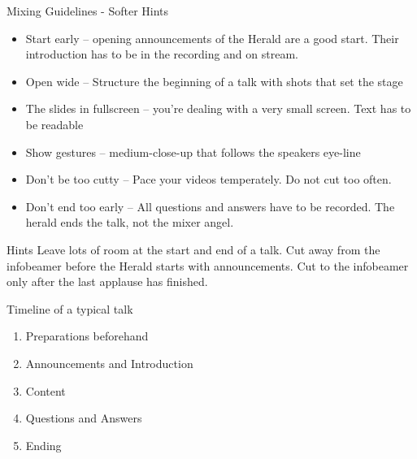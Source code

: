 \documentclass[aspectratio=169]{beamer}
\begin{document}
\begin{frame}{Mixing Guidelines - Softer Hints}
	\begin{itemize}
		\item Start early – opening announcements of the Herald are a good start. Their introduction has to be in the recording and on stream.
		\item Open wide – Structure the beginning of a talk with shots that set the stage
		\item The slides in fullscreen – you’re dealing with a very small screen. Text has to be readable
		\item Show gestures – medium-close-up that follows the speakers eye-line
		\item Don’t be too cutty – Pace your videos temperately. Do not cut too often.
		\item Don't end too early – All questions and answers have to be recorded. The herald ends the talk, not the mixer angel.
	\end{itemize}
	\begin{exampleblock}{Hints}
		Leave lots of room at the start and end of a talk. 
		Cut away from the infobeamer before the Herald starts with announcements. 
		Cut to the infobeamer only after the last applause has finished.
	\end{exampleblock}
\end{frame}


%
\begin{frame}{Timeline of a typical talk}
	\begin{enumerate}
		\item Preparations beforehand
		\item Announcements and Introduction
		\item Content
		\item Questions and Answers
		\item Ending
	\end{enumerate}
\end{frame}
\end{document}
